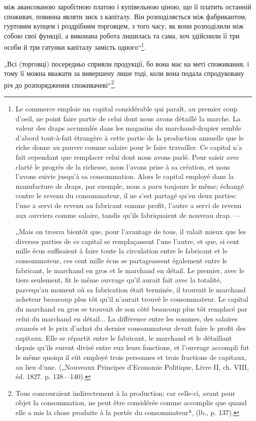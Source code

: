 між авансованою заробітною платою і купівельною ціною, що її платить
останній споживач, повинна являти зиск з капіталу. Він розподіляється
між фабрикантом, гуртовим купцем і роздрібним торговцем, з того часу,
як вони розподілили між собою свої функції, а виконана робота лишилась
та сама, хоч здійснили її три особи й три гатунки капіталу
замість одного“\footnote*{
Le commerce emploie un capital considérable qui paraît, au premier coup
d’oeil, ne point faire partie de celui dont nous avons détaillé la marche. La valeur
des draps accumulés dans les magasins du marchand-drapier semble d'abord tout-à-fait étrangère à
cette partie de la production annuelle que le riche donne au
pauvre comme salaire pour le faire travailler. Ce capital n’a fait cependant que
remplacer celui dont nous avons parlé. Pour saisir avec clarté le progrès de la
richesse, nous l’avons prise à sa création, et nous l’avons suivie jusqu’à sa consommation.
Alors le capital employé dans la manufacture de draps, par exemple, nous a paru
toujours le même; échangé contre le revenu du consommateur, il ne s’est partagé
qu’en deux parties: l’une a servi de revenu au fabricant comme profit, l’autre a servi de revenu aux
ouvriers comme salaire, tandis qu’ils fabriquaient de nouveau drap. —

„Mais on trouva bientôt que, pour l’avantage de tous, il valait mieux que les
diverses parties de ce capital se remplaçassent l’une l’autre, et que, si cent mille
écus suffisaient à faire toute la circulation entre le fabricant et le consommateur,
ces cent mille écus se partageassent également entre le fabricant, le marchand en
gros et le marchand en détail. Le premier, avec le tiers seulement, fit le même
ouvrage qu’il aurait fait avec la totalité, parcequ’au moment où sa fabrication était
terminée, il trouvait le marchand acheteur beaucoup plus tôt qu’il n’aurait trouvé le consommateur.
Le capital du marchand en gros se trouvait de son côté beaucoup
plus tôt remplacé par celui du marchand en détail... La différence entre les sommes, des salaires
avancés et le prix d’achat du dernier consommateur devait faire le profit des capitaux. Elle se
répartit entre le fabricant, le marchand et le détaillant depuis qu’ils eurent divisé entre eux
leurs fonctions, et l’ouvrage accompli fut le même quoiqu il eût employé trois personnes et trois
fractions de capitaux, au lieu d’une.
(„Nouveaux Principes d’Economie Politique, Livre II, ch. VIII, éd. 1827. p. 138—140).
}.

„Всі (торговці) посередньо сприяли продукції, бо вона має на меті
споживання, і тому її можна вважати за вивершену лише тоді, коли
вона подала спродуковану річ до розпорядження споживачеві“\footnote*{
Tous concouraient indirectement à la production; car celle-ci, avant pour
objet la consommation, ne peut être considérée comme accomplie que quand elle a
mis la chose produite à la portée du consommateur*, (lb., p. 137).
}.

